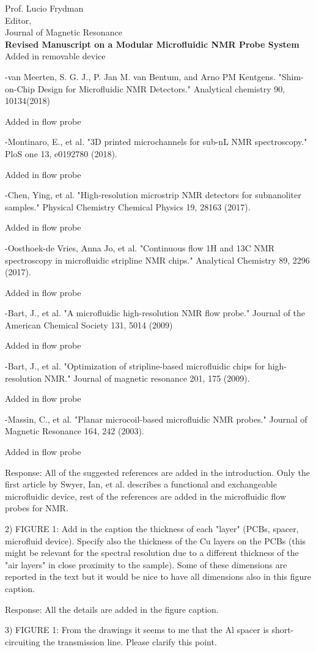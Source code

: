 \documentclass{mu-soton-letter}
\begin{document}
\begin{letter}{Prof. Lucio Frydman\\
  Editor,\\
  Journal of Magnetic Resonance\\[2cm]
  \textbf{Revised Manuscript on a Modular Microfluidic NMR Probe System}}
Added in removable device

-van Meerten, S. G. J., P. Jan M. van Bentum, and Arno PM Kentgens. "Shim-on-Chip Design for Microfluidic NMR Detectors." Analytical chemistry 90, 10134(2018)

Added in flow probe

-Montinaro, E., et al. "3D printed microchannels for sub-nL NMR spectroscopy." PloS one 13, e0192780 (2018).

Added in flow probe

-Chen, Ying, et al. "High-resolution microstrip NMR detectors for subnanoliter samples." Physical Chemistry Chemical Physics 19, 28163 (2017).

Added in flow probe

-Oosthoek-de Vries, Anna Jo, et al. "Continuous flow 1H and 13C NMR spectroscopy in microfluidic stripline NMR chips." Analytical Chemistry 89,  2296 (2017).

Added in flow probe

-Bart, J., et al. "A microfluidic high-resolution NMR flow probe." Journal of the American Chemical Society 131, 5014 (2009)

Added in flow probe

-Bart, J., et al. "Optimization of stripline-based microfluidic chips for high-resolution NMR." Journal of magnetic resonance 201, 175 (2009).

Added in flow probe

-Massin, C., et al. "Planar microcoil-based microfluidic NMR probes." Journal of Magnetic Resonance 164, 242 (2003).

Added in flow probe

Response: All of the suggested references are added in the introduction. Only the first article by Swyer, Ian, et al. describes a functional and exchangeable microfluidic device, rest of the references are added in the microfluidic flow probes for NMR.


2) FIGURE 1: Add in the caption the thickness of each "layer" (PCBs, spacer, microfluid device). Specify also the thickness of the Cu layers on the PCBs (this might be relevant for the spectral resolution due to a different thickness of the "air layers" in close proximity to the sample). Some of these dimensions are reported in the text but it would be nice to have all dimensions also in this figure caption.

Response: All the details are added in the figure caption.

3) FIGURE 1: From the drawings it seems to me that the Al spacer is short-circuiting the transmission line. Please clarify this point.


\end{letter}
\end{document}
